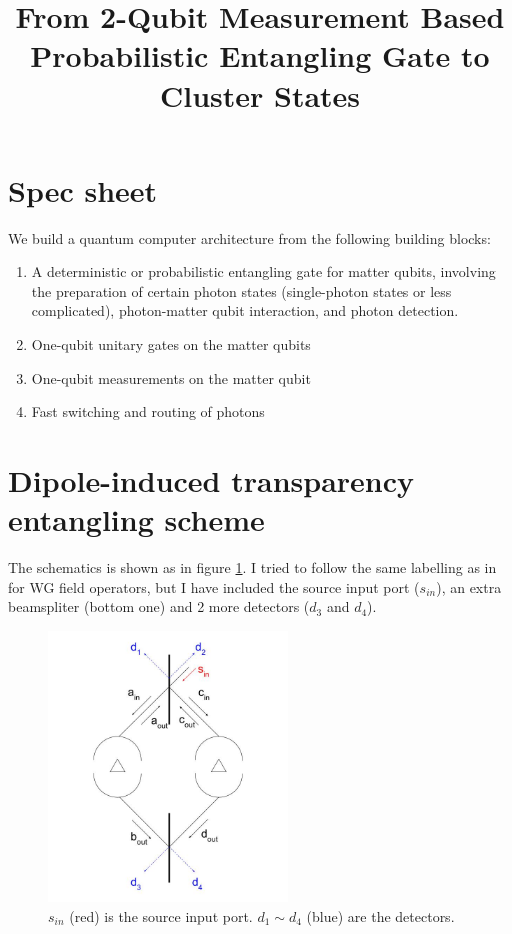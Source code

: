 \documentclass[letterpaper,10pt]{article}
\begin{document}
\title{From 2-Qubit Measurement Based Probabilistic Entangling Gate to Cluster States}

\section{Spec sheet}
\label{spec}
We build a quantum computer architecture from the following building blocks:
\begin{enumerate}
\item A deterministic or probabilistic entangling gate for matter qubits, involving the preparation of certain photon states (single-photon states or less complicated), photon-matter qubit interaction, and photon detection.
\item One-qubit unitary gates on the matter qubits
\item One-qubit measurements on the matter qubit
\item Fast switching and routing of photons
\end{enumerate}

\section{Dipole-induced transparency entangling scheme}
\label{sec:DIT}
The schematics is shown as in figure \ref{fig:schematics}. I tried to follow the same labelling as in \cite{Sridharan2008} for WG field operators, but I have included the source input port ($s_{in}$), an extra beamspliter (bottom one) and 2 more detectors ($d_3$ and $d_4$). \\

\begin{figure}[h]
\centering
         \includegraphics[width=2.5in]{DIT_entanglement.jpg}
         \caption{$s_{in}$ (red) is the source input port. $d_1\sim d_4$ (blue) are the detectors. }
         \label{fig:schematics}
\end{figure}
\end{document}
